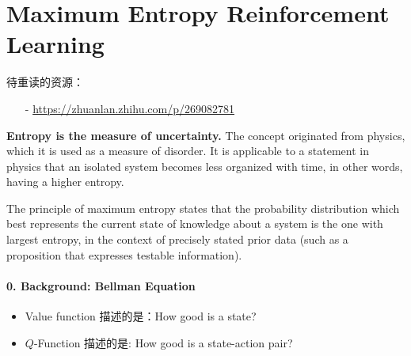 ﻿

\chapter{Maximum Entropy Reinforcement Learning}

待重读的资源：
\begin{itemize}
\setlength{\parskip}{0pt}
\item[-]
\url{https://zhuanlan.zhihu.com/p/269082781}
\end{itemize}


{\bf Entropy is the measure of uncertainty.} The concept originated from 
physics, which it is used as a measure of disorder. It is applicable to 
a statement in physics that an isolated system becomes less organized with 
time, in other words, having a higher entropy.

The principle of maximum entropy states that the probability distribution 
which best represents the current state of knowledge about a system is the 
one with largest entropy, in the context of precisely stated prior data 
(such as a proposition that expresses testable information).

\subsubsection{0. Background: Bellman Equation}

\begin{itemize}
\item
Value function 描述的是：How good is a state?

\item
$Q$-Function 描述的是: How good is a state-action pair?
\end{itemize}

